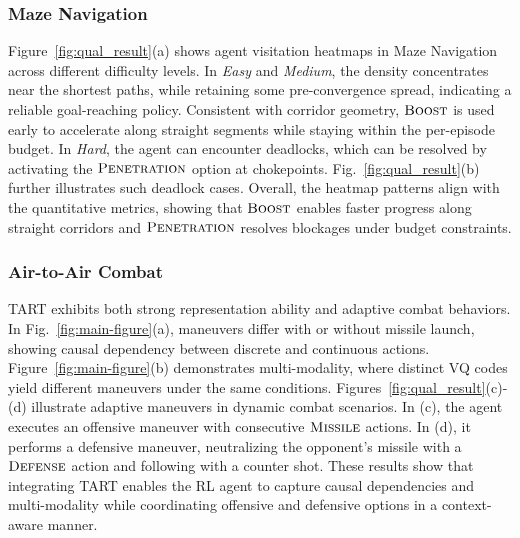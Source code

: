 \subsubsection{Maze Navigation}
Figure~\ref{fig:qual_result}(a) shows agent visitation heatmaps in Maze Navigation across different difficulty levels.
In \emph{Easy} and \emph{Medium}, the density concentrates near the shortest paths, while retaining some pre-convergence spread, indicating a reliable goal-reaching policy.
Consistent with corridor geometry, $\textsc{Boost}$ is used early to accelerate along straight segments while staying within the per-episode budget.
In \emph{Hard}, the agent can encounter deadlocks, which can be resolved by activating the $\textsc{Penetration}$ option at chokepoints.
Fig.~\ref{fig:qual_result}(b) further illustrates such deadlock cases.
Overall, the heatmap patterns align with the quantitative metrics, showing that $\textsc{Boost}$ enables faster progress along straight corridors and $\textsc{Penetration}$ resolves blockages under budget constraints.

\subsubsection{Air-to-Air Combat}
TART exhibits both strong representation ability and adaptive combat behaviors. 
In Fig.~\ref{fig:main-figure}(a), maneuvers differ with or without missile launch, showing causal dependency between discrete and continuous actions.
Figure~\ref{fig:main-figure}(b) demonstrates multi-modality, where distinct VQ codes yield different maneuvers under the same conditions.
Figures~\ref{fig:qual_result}(c)-(d) illustrate adaptive maneuvers in dynamic combat scenarios.
In (c), the agent executes an offensive maneuver with consecutive $\textsc{Missile}$ actions.
In (d), it performs a defensive maneuver, neutralizing the opponent's missile with a $\textsc{Defense}$ action and following with a counter shot.
These results show that integrating TART enables the RL agent to capture causal dependencies and multi-modality while coordinating offensive and defensive options in a context-aware manner.